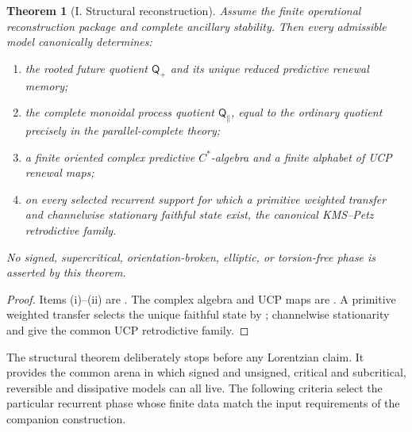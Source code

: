 \documentclass[11pt]{article}
\newtheorem{theorem}{Theorem}[section]
\theoremstyle{definition}
\theoremstyle{remark}
\newcommand{\Qq}{\mathsf Q}
\begin{document}
\begin{theorem}[I. Structural reconstruction]
\label{thm:structural-reconstruction}
Assume the finite operational reconstruction package and complete ancillary
stability.  Then every admissible model canonically determines:
\begin{enumerate}[label=\textup{(\roman*)},leftmargin=2.4em]
\item the rooted future quotient $\Qq_+$ and its unique reduced predictive
      renewal memory;
\item the complete monoidal process quotient $\Qq_{\parallel}$, equal to the
      ordinary quotient precisely in the parallel-complete theory;
\item a finite oriented complex predictive $C^*$-algebra and a finite alphabet
      of UCP renewal maps;
\item on every selected recurrent support for which a primitive weighted
      transfer and channelwise stationary faithful state exist, the canonical
      KMS--Petz retrodictive family.
\end{enumerate}
No signed, supercritical, orientation-broken, elliptic, or torsion-free phase is
asserted by this theorem.
\end{theorem}

\begin{proof}
Items (i)--(ii) are
.
The complex algebra and UCP maps are
.  A primitive weighted transfer
selects the unique faithful state by
; channelwise stationarity and
 give the common UCP retrodictive family.
\end{proof}

The structural theorem deliberately stops before any Lorentzian claim.  It
provides the common arena in which signed and unsigned, critical and subcritical,
reversible and dissipative models can all live.  The following criteria select the
particular recurrent phase whose finite data match the input requirements of the
companion construction.
\end{document}
